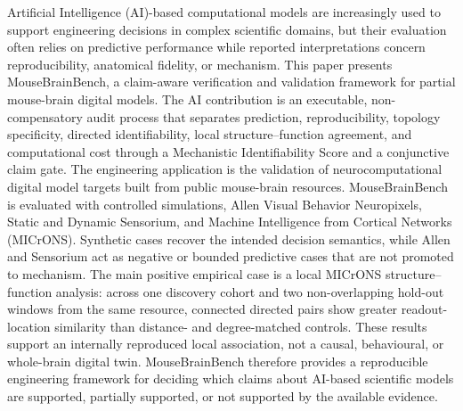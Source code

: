 Artificial Intelligence (AI)-based computational models are increasingly used to support engineering decisions in complex scientific domains, but their evaluation often relies on predictive performance while reported interpretations concern reproducibility, anatomical fidelity, or mechanism. This paper presents MouseBrainBench, a claim-aware verification and validation framework for partial mouse-brain digital models. The AI contribution is an executable, non-compensatory audit process that separates prediction, reproducibility, topology specificity, directed identifiability, local structure--function agreement, and computational cost through a Mechanistic Identifiability Score and a conjunctive claim gate. The engineering application is the validation of neurocomputational digital model targets built from public mouse-brain resources. MouseBrainBench is evaluated with controlled simulations, Allen Visual Behavior Neuropixels, Static and Dynamic Sensorium, and Machine Intelligence from Cortical Networks (MICrONS). Synthetic cases recover the intended decision semantics, while Allen and Sensorium act as negative or bounded predictive cases that are not promoted to mechanism. The main positive empirical case is a local MICrONS structure--function analysis: across one discovery cohort and two non-overlapping hold-out windows from the same resource, connected directed pairs show greater readout-location similarity than distance- and degree-matched controls. These results support an internally reproduced local association, not a causal, behavioural, or whole-brain digital twin. MouseBrainBench therefore provides a reproducible engineering framework for deciding which claims about AI-based scientific models are supported, partially supported, or not supported by the available evidence.
